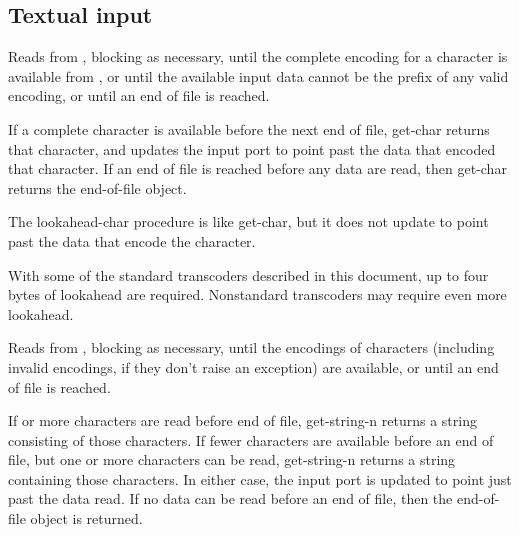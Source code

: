 \subsection{Textual input}

\begin{entry}{%
}
   
Reads from , blocking as necessary, until the
complete encoding for a character is available from ,
or until the available input data cannot be the prefix of any valid encoding,
or until an end of file is reached.

If a complete character is available before the next end of file, {\cf
  get-char} returns that character, and updates the input port to
point past the data that encoded that character. If an end of file is
reached before any data are read, then {\cf get-char} returns the
end-of-file object.
\end{entry}

\begin{entry}{%
}
  
The {\cf lookahead-char} procedure is like {\cf get-char}, but it does not 
update  to point past the data
that encode the character.

\begin{note}
  With some of the standard transcoders
  described in this document, up to four bytes of lookahead are
  required. Nonstandard transcoders may require even more lookahead.
\end{note}
\end{entry}

\begin{entry}{%
}
   
Reads from , blocking as necessary, until the
encodings of  characters (including invalid encodings, if they
don't raise an exception) are available, or until an end of
file is reached.
   
If  or more characters are read before end of file, {\cf
  get-string-n} returns a string consisting of those 
characters. If fewer characters are available before an end of file,
but one or more characters can be read,
{\cf get-string-n} returns a string containing
those characters. In either case, the input port is updated to point
just past the data read. If no data can be read before an 
end of file, then the end-of-file object is returned.
\end{entry}

